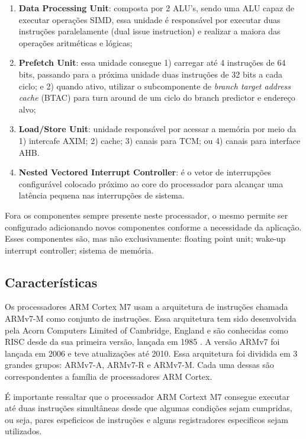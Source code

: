 \documentclass[10pt, a4paper]{article}
\begin{document}
\begin{enumerate}
\item \textbf{Data Processing Unit}: composta por 2 ALU's, sendo uma ALU capaz de executar operações SIMD, essa unidade é responsável por executar duas instruções paralelamente (dual issue instruction) e realizar a maiora das operações aritméticas e lógicas;
    
\item \textbf{Prefetch Unit}: essa unidade consegue 1) carregar até 4 instruções de 64 bits, passando para a próxima unidade duas instruções de 32 bits a cada ciclo; e 2) quando ativo, utilizar o subcomponente de \textit{branch target address cache} (BTAC) para turn around de um ciclo do branch predictor e endereço alvo;

\item \textbf{Load/Store Unit}: unidade responsável por acessar a memória por meio da 1) intercafe AXIM; 2) cache; 3) canais para TCM; ou 4) canais para interface AHB.
    
\item \textbf{Nested Vectored Interrupt Controller}: é o vetor de interrupções configurável colocado próximo ao core do processador para alcançar uma latência pequena nas interrupções de sistema.
\end{enumerate}

Fora os componentes sempre presente neste processador, o mesmo permite ser configurado adicionando novos componentes conforme a necessidade da aplicação. Esses componentes são, mas não exclusivamente: floating point unit; wake-up interrupt controller; sistema de memória.

\subsection{Características}

Os processadores ARM Cortex M7 usam a arquitetura de instruções chamada ARMv7-M como conjunto de instruções. Essa arquitetura tem sido desenvolvida pela Acorn Computers Limited of Cambridge, England e são conhecidas como RISC desde da sua primeira versão, lançada em 1985 \autocite{arm-white-paper} \autocite{arm-furber}. A versão ARMv7 foi lançada em 2006 e teve atualizações até 2010. Essa arquitetura foi dividida em 3 grandes grupos: ARMv7-A, ARMv7-R e ARMv7-M. Cada uma dessas são correspondentes a família de processadores ARM Cortex.
     
É importante ressaltar que o processador ARM Cortext M7 consegue executar até duas instruções simultâneas desde que algumas condições sejam cumpridas, ou seja, pares espeficicos de instruções e alguns registradores especificos sejam utilizados.
\end{document}
